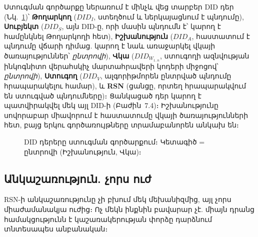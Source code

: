 \documentclass[11pt,a4paper,twocolumn]{article}
\begin{document}
Ստուգման գործարքը ներառում է մինչև վեց տարբեր DID դեր (Նկ.~\ref{fig:roles})՝ \textbf{Թողարկող} ($DID_I$, ստեղծում և ներկայացնում է պնդումը), \textbf{Սուբյեկտ} ($DID_S$, այն DID-ը, որի մասին պնդումն է՝ կարող է համընկնել Թողարկողի հետ), \textbf{Իշխանություն} ($DID_A$, հաստատում է պնդումը վճարի դիմաց. կարող է նաև առաջարկել վկայի ծառայություններ՝ \emph{ընտրովի}), \textbf{Վկա} ($DID_{W_{1..n}}$, ստուգողի ազնվության ինկոգնիտո վերահսկիչ մարտահրավերի կոդերի միջոցով՝ \emph{ընտրովի}), \textbf{Ստուգող} ($DID_V$, ալգորիթմորեն ընտրված պնդումը հրապարակելու համար), և \textbf{RSN} (ցանցը, որտեղ հրապարակվում են ստուգված պնդումները)։ Ցանկացած դեր կարող է պատվիրակվել մեկ այլ DID-ի (Բաժին~7.4)։ Իշխանությունը սովորաբար միավորում է հաստատումը վկայի ծառայությունների հետ, բայց երկու գործառույթները տրամաբանորեն անկախ են։

\begin{figure}[ht]
\centering
{}
\caption{DID դերերը ստուգման գործարքում։ Կետագիծ = ընտրովի (Իշխանություն, Վկա)։}
\label{fig:roles}
\end{figure}

\subsection{Անկաշառություն. չորս ուժ}

RSN-ի անկաշառությունը չի բխում մեկ մեխանիզմից, այլ չորս միաժամանակյա ուժից։ Ոչ մեկն ինքնին բավարար չէ. միայն դրանց համակցությունն է կաշառակերության փորձը դարձնում տնտեսապես անբանական։
\end{document}
